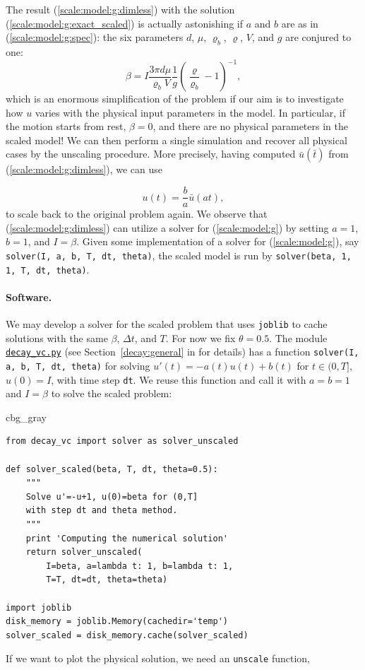 \documentclass[graybox,envcountchap,sectrefs,final]{svmonodo}
\newenvironment{_cod_tight}[1]{
   \def\FrameCommand{\colorbox{#1}}
   \FrameRule0.6pt\MakeFramed {\FrameRestore}\vskip3mm}
   {\vskip0mm\endMakeFramed}
\newenvironment{cod}[1]{
\bgroup\rmfamily
\fboxsep=0mm\relax
\begin{_cod_tight}{#1}
\list{}{\parsep=-2mm\parskip=0mm\topsep=0pt\leftmargin=2mm
\rightmargin=2\leftmargin\leftmargin=4pt\relax}
\item\relax}
{\endlist\end{_cod_tight}\egroup}
\begin{document}
The result (\ref{scale:model:g:dimless}) with the
solution (\ref{scale:model:g:exact_scaled}) is actually
astonishing if $a$ and $b$ are as in (\ref{scale:model:g:spec}):
the six parameters $d$, $\mu$, $\varrho_b$, $\varrho$, $V$, and $g$
are conjured to one:
\[ \beta = I\frac{3\pi d\mu}{\varrho_b V}
\frac{1}{g}\left(\frac{\varrho}{\varrho_b} -1\right)^{-1},
\]
which is an enormous simplification of the problem if our aim is to
investigate how $u$ varies with the physical input parameters in
the model.
In particular, if the motion starts from rest, $\beta=0$, and
there are no physical parameters in the scaled model!
We can then perform a single simulation and recover all physical
cases by the unscaling procedure. More precisely,
having computed $\bar u(\bar t)$ from (\ref{scale:model:g:dimless}),
we can use

\begin{equation}
u(t) = \frac{b}{a}\bar u(at),
\end{equation}
to scale back to the original
problem again.
We observe that (\ref{scale:model:g:dimless}) can utilize a solver
for (\ref{scale:model:g}) by setting $a=1$, $b=1$, and $I=\beta$.
Given some implementation of a solver for (\ref{scale:model:g}),
say \texttt{solver(I, a, b, T, dt, theta)},
the scaled model is run by \texttt{solver(beta, 1, 1, T, dt, theta)}.



\paragraph{Software.}
We may develop a solver for the scaled problem that uses \texttt{joblib}
to cache solutions with the same $\beta$, $\Delta t$, and $T$.
For now we fix $\theta=0.5$.
The module \href{{http://tinyurl.com/o8pb3yy/decay_vc.py}}{\nolinkurl{decay_vc.py}}
(see Section~\ref{decay:general} in \cite{Langtangen_decay} for details)
has a function
\texttt{solver(I, a, b, T, dt, theta)} for solving $u'(t)=-a(t)u(t)+b(t)$ for
$t\in (0,T]$, $u(0)=I$, with time step \texttt{dt}.
We reuse this function and call it with $a=b=1$ and $I=\beta$ to solve
the scaled problem:

\begin{cod}{cbg_gray}\begin{Verbatim}[numbers=none,fontsize=\fontsize{9pt}{9pt},baselinestretch=0.95,xleftmargin=2mm]
from decay_vc import solver as solver_unscaled

def solver_scaled(beta, T, dt, theta=0.5):
    """
    Solve u'=-u+1, u(0)=beta for (0,T]
    with step dt and theta method.
    """
    print 'Computing the numerical solution'
    return solver_unscaled(
        I=beta, a=lambda t: 1, b=lambda t: 1,
        T=T, dt=dt, theta=theta)

import joblib
disk_memory = joblib.Memory(cachedir='temp')
solver_scaled = disk_memory.cache(solver_scaled)
\end{Verbatim}
\end{cod}
\noindent
If we want to plot the physical solution, we need an \texttt{unscale} function,
\end{document}
